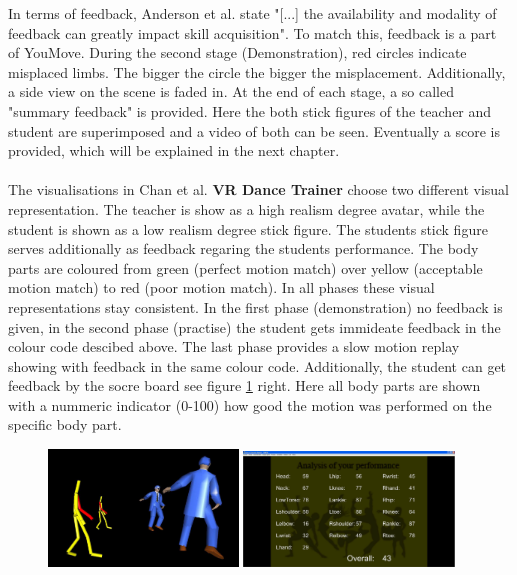 In terms of feedback, Anderson et al. state "[...] the availability and modality of feedback can greatly impact skill acquisition". To match this, feedback is a part of YouMove. During the second stage (Demonstration), red circles indicate misplaced limbs. The bigger the circle the bigger the misplacement. Additionally, a side view on the scene is faded in. At the end of each stage, a so called "summary feedback" is provided. Here the both stick figures of the teacher and student are superimposed and a video of both can be seen. Eventually a score is provided, which will be explained in the next chapter.\\ \\
The visualisations in Chan et al. \textbf{VR Dance Trainer} choose two different visual representation. The teacher is show as a high realism degree avatar, while the student is shown as a low realism degree stick figure. The students stick figure serves additionally as feedback regaring the students performance. The body parts are coloured from green (perfect motion match) over yellow (acceptable motion match) to red (poor motion match). In all phases these visual representations stay consistent. In the first phase (demonstration) no feedback is given, in the second phase (practise) the student gets immideate feedback in the colour code descibed above. The last phase provides a slow motion replay showing with feedback in the same colour code. Additionally, the student can get feedback by the socre board see figure \ref{fig:vrdt} right. Here all body parts are shown with a nummeric indicator (0-100) how good the motion was performed on the specific body part.
\begin{figure}
	\centering
	\includegraphics[width=0.45\textwidth]{img/VRDanceTrainerPractice.png}
	\includegraphics[width=0.5\textwidth]{img/VRDanceTrainerScoreBoard.png}
	\caption{\todo \cite{Chan2011}}
	\label{fig:vrdt}
\end{figure}
